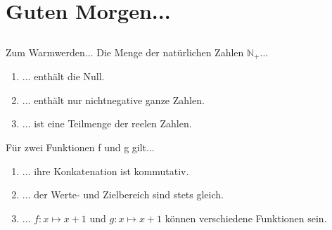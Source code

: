 \section[Einstieg]{Guten Morgen...}
\subsection*{}
\begin{frame}{Zum Warmwerden...}
  Die Menge der natürlichen Zahlen $\mathbb{N_+}$...
    \begin{enumerate}
    \item { 
    ... enthält die Null.
    }
    \item { 
    ... enthält nur nichtnegative ganze Zahlen.
    }
    \item { 
    ... ist eine Teilmenge der reelen Zahlen.
    }
    \end{enumerate}
\vspace{1em}
  Für zwei Funktionen f und g gilt...
    \begin{enumerate}
    \item { 
    ... ihre Konkatenation ist kommutativ.
    }
    \item { 
    ... der Werte- und Zielbereich sind stets gleich.
    }
    \item { 
    ... $f: x\mapsto x+1$ und $g: x \mapsto x+1$ können verschiedene Funktionen sein.
    }
    \end{enumerate}

\end{frame}

